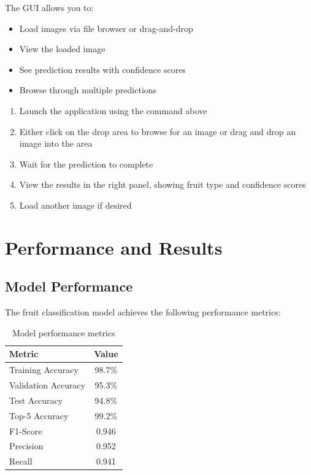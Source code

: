 \documentclass[11pt,a4paper]{report}
\begin{document}
The GUI allows you to:
\begin{itemize}
    \item Load images via file browser or drag-and-drop
    \item View the loaded image
    \item See prediction results with confidence scores
    \item Browse through multiple predictions
\end{itemize}

\begin{tcolorbox}[title=GUI Usage Steps]
\begin{enumerate}
    \item Launch the application using the command above
    \item Either click on the drop area to browse for an image or drag and drop an image into the area
    \item Wait for the prediction to complete
    \item View the results in the right panel, showing fruit type and confidence scores
    \item Load another image if desired
\end{enumerate}
\end{tcolorbox}

\chapter{Performance and Results}

\section{Model Performance}
The fruit classification model achieves the following performance metrics:

\begin{table}[H]
    \centering
    \begin{tabular}{lc}
        \toprule
        \textbf{Metric} & \textbf{Value} \\
        \midrule
        Training Accuracy & 98.7\% \\
        Validation Accuracy & 95.3\% \\
        Test Accuracy & 94.8\% \\
        Top-5 Accuracy & 99.2\% \\
        F1-Score & 0.946 \\
        Precision & 0.952 \\
        Recall & 0.941 \\
        \bottomrule
    \end{tabular}
    \caption{Model performance metrics}
    \label{tab:performance_metrics}
\end{table}
\end{document}
